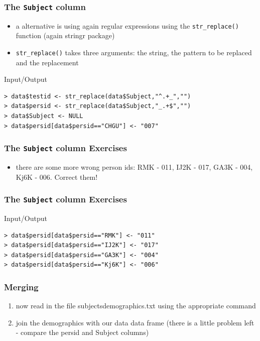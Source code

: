 \documentclass[xcolor={table},c]{beamer}
\begin{document}
\begin{frame}[fragile]\frametitle{The \texttt{Subject} column}
  \begin{itemize}
  \item a alternative is using again regular expressions using the \texttt{str\_replace()} function (again stringr package)
  \item \texttt{str\_replace()} takes three arguments: the string, the pattern to be replaced and the replacement
  \end{itemize}
\begin{exampleblock}{Input/Output}\small
\begin{verbatim}
> data$testid <- str_replace(data$Subject,"^.+_","")
> data$persid <- str_replace(data$Subject,"_.+$","")
> data$Subject <- NULL
> data$persid[data$persid=="CHGU"] <- "007"
\end{verbatim}
    \end{exampleblock}
\end{frame}



\begin{frame}[fragile]\frametitle{The \texttt{Subject} column Exercises}
  \begin{itemize}
  \item there are some more wrong person ids: RMK - 011, IJ2K - 017, GA3K - 004, Kj6K - 006. Correct them!
  \end{itemize}
\end{frame}

\begin{frame}[fragile]\frametitle{The \texttt{Subject} column Exercises}
\begin{exampleblock}{Input/Output}\small
\begin{verbatim}
> data$persid[data$persid=="RMK"] <- "011"
> data$persid[data$persid=="IJ2K"] <- "017"
> data$persid[data$persid=="GA3K"] <- "004"
> data$persid[data$persid=="Kj6K"] <- "006"
\end{verbatim}
    \end{exampleblock}
\end{frame}


\begin{frame}[fragile]\frametitle{Merging}
  \begin{enumerate}
  \item now read in the file subjectsdemographics.txt using the appropriate command
  \item join the demographics with our data data frame (there is a little problem left - compare the persid and Subject columns)
  \end{enumerate}
\end{frame}
\end{document}
